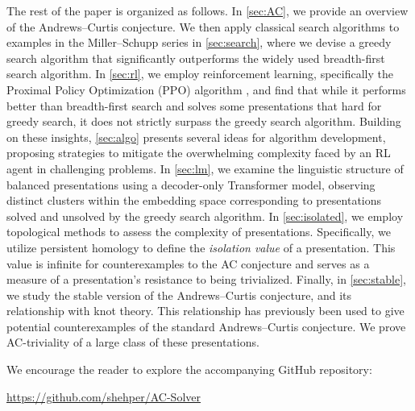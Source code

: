 \medskip The rest of the paper is organized as follows. In \cref{sec:AC}, we provide an overview of the Andrews--Curtis conjecture. We then apply classical search algorithms to examples in the Miller--Schupp series in \cref{sec:search}, where we devise a greedy search algorithm that significantly outperforms the widely used breadth-first search algorithm. In \cref{sec:rl}, we employ reinforcement learning, specifically the Proximal Policy Optimization (PPO) algorithm \cite{schulman2017proximal}, and find that while it performs better than breadth-first search and solves some presentations that hard for greedy search, it does not strictly surpass the greedy search algorithm.
Building on these insights, \cref{sec:algo} presents several ideas for algorithm development, proposing strategies to mitigate the overwhelming complexity faced by an RL agent in challenging problems.
In \cref{sec:lm}, we examine the linguistic structure of balanced presentations using a decoder-only Transformer model, observing distinct clusters within the embedding space corresponding to presentations solved and unsolved by the greedy search algorithm.
In \cref{sec:isolated}, we employ topological methods to assess the complexity of presentations. Specifically, we utilize persistent homology to define the \textit{isolation value} of a presentation. This value is infinite for counterexamples to the AC conjecture and serves as a measure of a presentation's resistance to being trivialized. Finally, in \cref{sec:stable}, we study the stable version of the Andrews--Curtis conjecture, and its relationship with knot theory.
This relationship has previously been used to give potential counterexamples of the standard Andrews--Curtis conjecture. We prove AC-triviality of a large class of these presentations. 

\medskip\noindent
We encourage the reader to explore the accompanying GitHub repository:
\begin{center}
	\href{https://github.com/shehper/AC-Solver}{https://github.com/shehper/AC-Solver}
\end{center}